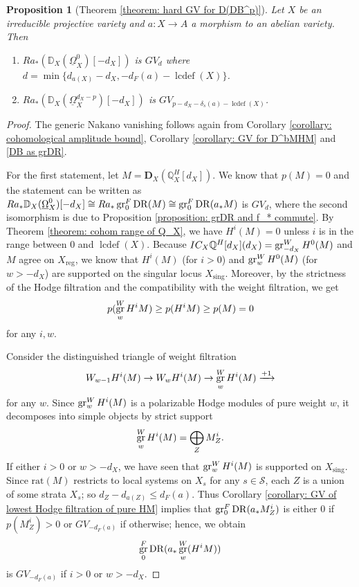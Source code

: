 \documentclass[11pt]{amsart}
\newtheorem{proposition}[equation]{Proposition}
\theoremstyle{definition}
\theoremstyle{plain}
\newcommand{\bD}{\mathbf D}
\newcommand{\QQ}{\mathbb Q}
\newcommand{\DD}{\mathbb D}
\newcommand{\sS}{\mathscr S}
\newcommand{\xto}{\xrightarrow} %
\newcommand{\DB}{\underline{\Omega}} %
\DeclareMathOperator{\DR}{DR}
\DeclareMathOperator{\sing}{sing}
\DeclareMathOperator{\reg}{reg}
\DeclareMathOperator{\gr}{{\rm gr}}
\DeclareMathOperator{\lcdef}{lcdef}
\begin{document}
\begin{proposition} [Theorem \ref{theorem: hard GV for D(DB^p)}]
    Let $X$ be an irreducible projective variety and $a: X \to A$ a morphism to an abelian variety. Then 
    \begin{enumerate}
        \item $R a_* (\DD_X(\DB^0_X)[-d_X])$ is $GV_{d}$ where $d=\min\{d_{a(X)}-d_X, -d_F(a) -\lcdef(X)\}$. 
        \item $R a_* (\DD_X(\DB_X^{d_X-p})[-d_X])$ is $GV_{p-d_X-\delta_s(a)-\lcdef(X)}$.
    \end{enumerate}
\end{proposition}

\begin{proof} 
    The generic Nakano vanishing follows again from Corollary \ref{corollary: cohomological amplitude bound}, Corollary \ref{corollary: GV for D^bMHM} and \ref{DB as grDR}.
    
    For the first statement, let $M = \bD_X(\QQ^H_X[d_X])$. We know that $p(M) = 0$ and the statement can be written as $R a_* \DD_X(\DB^0_X)[-d_X] \cong R a_* \gr^F_{0}\DR(M) \cong \gr^F_0 \DR(a_* M)$ is $GV_{d}$, where the second isomorphism is due to Proposition \ref{proposition: grDR and f_* commute}. By Theorem \ref{theorem: cohom range of Q_X}, we have $H^i(M)=0$ unless $i$ is in the range between $0$ and $\lcdef(X)$. Because $IC_X\QQ^H[d_X](d_X) = \gr^W_{-d_X} H^0(M)$ and $M$ agree on $X_{\reg}$, we know that $H^i(M)$ (for $i>0$) and $\gr^W_{w} H^0(M)$ (for $w> -d_X$) are supported on the singular locus $X_{\sing}$. Moreover, by the strictness of the Hodge filtration and the compatibility with the weight filtration, we get
    \[p(\gr^W_w H^i M) \ge p(H^i M) \ge p(M) = 0\]
    for any $i, w$. 
    
    Consider the distinguished triangle of weight filtration
    \[W_{w-1} H^i(M) \to W_w H^i(M) \to \gr^W_w H^i(M) \xto{+1}\]
    for any $w$. Since $\gr^W_w H^i(M)$ is a polarizable Hodge modules of pure weight $w$, it decomposes into simple objects by strict support
    \[\gr^W_w H^i(M) = \bigoplus_{Z} M^i_Z.\]
    If either $i>0$ or $w > -d_X$, we have seen that $\gr^W_w H^i(M)$ is supported on $X_{\sing}$. Since $\text{rat}(M)$ restricts to local systems on $X_s$ for any $s\in \sS$, each $Z$ is a union of some strata $X_s$; so $d_{Z} - d_{a(Z)} \le d_F(a)$. Thus Corollary \ref{corollary: GV of lowest Hodge filtration of pure HM} implies that $\gr^F_0 \DR(a_* M^i_Z)$ is either $0$ if $p(M^i_Z) >0$ or $GV_{-d_F(a)}$ if otherwise; hence, we obtain
    \[\gr^F_{0} \DR(a_* \gr^W_w (H^iM))\]
    is $GV_{-d_F(a)}$ if $i>0$ or $w>-d_X$. 
    

\end{proof}
\end{document}
